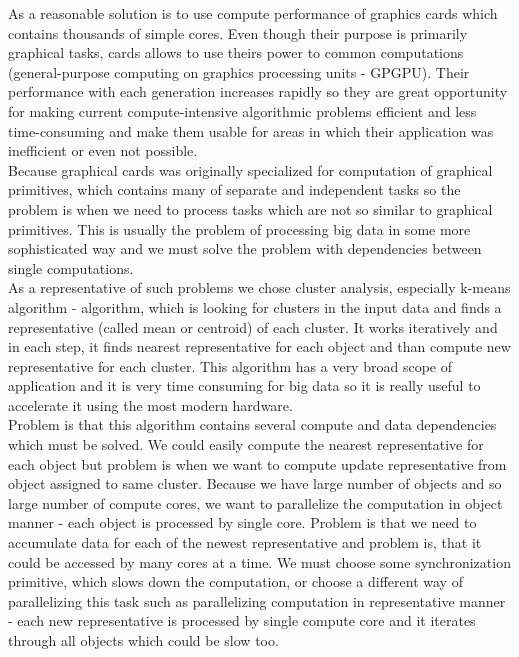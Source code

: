 As a reasonable solution is to use compute performance of graphics cards which contains thousands of simple cores. Even though their purpose is primarily graphical tasks, cards allows to use theirs power to common computations (general-purpose computing on graphics processing units - GPGPU). Their performance with each generation increases rapidly so they are great opportunity for making current compute-intensive algorithmic problems efficient and less time-consuming and make them usable for areas in which their application was inefficient or even not possible.\\
Because graphical cards was originally specialized for computation of graphical primitives, which contains many of separate and independent tasks so the problem is when we need to process tasks which are not so similar to graphical primitives. This is usually the problem of processing big data in some more sophisticated way and we must solve the problem with dependencies between single computations. \\

As a representative of such problems we chose cluster analysis, especially k-means algorithm - algorithm, which is looking for clusters in the input data and finds a representative (called mean or centroid) of each cluster. It works iteratively and in each step, it finds nearest representative for each object and than compute new representative for each cluster. This algorithm has a very broad scope of application and it is very time consuming for big data so it is really useful to accelerate it using the most modern hardware.\\

Problem is that this algorithm contains several compute and data dependencies which must be solved. We could easily compute the nearest representative for each object but problem is when we want to compute update representative from object assigned to same cluster. Because we have large number of objects and so large number of compute cores, we want to parallelize the computation in object manner - each object is processed by single core. Problem is that we need to accumulate data for each of the newest representative and problem is, that it could be accessed by many cores at a time. We must choose some synchronization primitive, which slows down the computation, or choose a different way of parallelizing this task such as parallelizing computation in representative manner - each new representative is processed by single compute core and it iterates through all objects which could be slow too.\\

